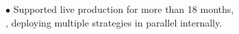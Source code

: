 \documentclass[9pt]{developercv} %
\newcommand{\myHilight}[2]{\tcbtp{\textit{\color{#1}{#2}}}}
\begin{document}
\begin{entrylist}
{            $\bullet$ Supported live production for more than 18 months, 
                      \myHilight{textcolor}{managing 10–15K orders/day across}\\
                      \hspace*{0.7em}\myHilight{textcolor}{ 3–5 FX trading venues}, 
                      deploying multiple strategies in parallel internally.
        }


\end{entrylist}
\end{document}
